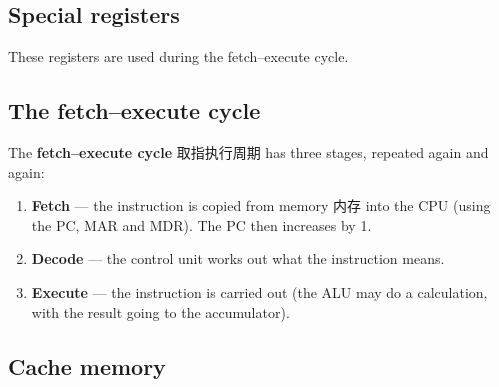 \documentclass[11pt]{article}
\begin{document}
\subsection*{Special registers}

These registers are used during the fetch–execute cycle.

\begin{center}
\end{center}

\subsection*{The fetch–execute cycle}

The \textbf{fetch–execute cycle} 取指执行周期 has three stages, repeated again and again:

\begin{enumerate}
\item \textbf{Fetch} — the instruction is copied from memory 内存 into the CPU (using the PC, MAR and MDR). The PC then increases by 1.

\item \textbf{Decode} — the control unit works out what the instruction means.

\item \textbf{Execute} — the instruction is carried out (the ALU may do a calculation, with the result going to the accumulator).

\end{enumerate}

\subsection*{Cache memory}
\end{document}
